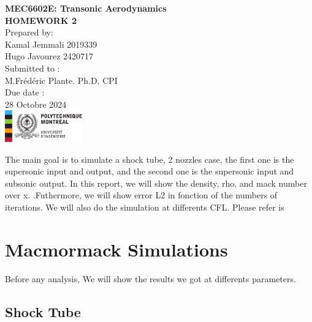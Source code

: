 \documentclass[12pt]{article}
\begin{document}
\begin{titlepage}
    \centering
    \vspace*{5cm}
    
    {\Huge \textbf{MEC6602E: Transonic Aerodynamics}}\\[1.5cm]
    
    {\Large \textbf{HOMEWORK 2}}\\[2cm]
    
    {\Large Prepared by:}\\
    {\Large Kamal Jemmali 2019339}\\
    {\Large Hugo Javourez 2420717}\\[1.5cm]
    
    {\Large Submitted to :}\\
    {\Large M.Frédéric Plante. Ph.D, CPI}\\[2cm]
    
    {\Large Due date :}\\
    {\Large 28 Octobre 2024}\\
    
    \vfill
    \includegraphics[width=0.25\textwidth]{polytechnique-signature-rgb-gauche-fr.png} %
    
    \vfill
\end{titlepage}

The main goal is to simulate a shock tube, 2 nozzles case, the first one is the supersonic input and output,
and the second one is the supersonic input and subsonic output. In this report, we will show the density, rho, and mack number over x.
.Futhermore, we will show error L2 in fonction of the numbers of iterations. We will also do the simulation at differents CFL.
Please refer is 

\section{Macmormack Simulations}

Before any analysis, We will show the results we got at differents parameters. 

\subsection{Shock Tube}
\end{document}
